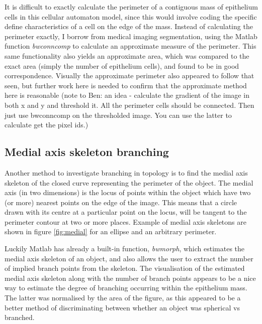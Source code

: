 \documentclass[pdftex,10pt,a4paper]{article}
\begin{document}
It is difficult to exactly calculate the perimeter of a contiguous mass of epithelium cells in this cellular automaton model, since this would involve coding the specific define characteristics of a cell on the edge of the mass. Instead of calculating the perimeter exactly, I borrow from medical imaging segmentation, using the Matlab function \emph{bwconncomp} to calculate an approximate measure of the perimeter. This same functionality also yields an approximate area, which was compared to the exact area (simply the number of epithelium cells), and found to be in good correspondence. Visually the approximate perimeter also appeared to follow that seen, but further work here is needed to confirm that the approximate method here is reasonable (note to Ben: an idea - calculate the gradient of the image in both x and y and threshold it. All the perimeter cells should be connected. Then just use bwconncomp on the thresholded image. You can use the latter to calculate get the pixel ids.)

\subsection{Medial axis skeleton branching}\label{sec:branches}
Another method to investigate branching in topology is to find the medial axis skeleton of the closed curve representing the perimeter of the object. The medial axis (in two dimensions) is the locus of points within the object which have two (or more) nearest points on the edge of the image. This means that a circle drawn with its centre at a particular point on the locus, will be tangent to the perimeter contour at two or more places. Example of medial axis skeletons are shown in figure \ref{fig:medial} for an ellipse and an arbitrary perimeter.

Luckily Matlab has already a built-in function, \emph{bwmorph}, which estimates the medial axis skeleton of an object, and also allows the user to extract the number of implied branch points from the skeleton. The visualisation of the estimated medial axis skeleton along with the number of branch points appears to be a nice way to estimate the degree of branching occurring within the epithelium mass. The latter was normalised by the area of the figure, as this appeared to be a better method of discriminating between whether an object was spherical vs branched.
\end{document}

